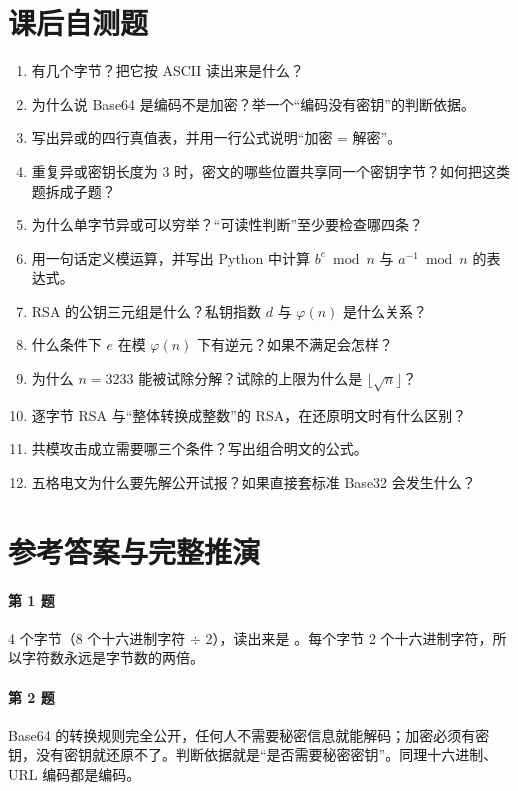 \documentclass[UTF8,12pt,oneside]{ctexbook}
\begin{document}
\section{课后自测题}
\begin{enumerate}
\item {} 有几个字节？把它按 ASCII 读出来是什么？
\item 为什么说 Base64 是编码不是加密？举一个“编码没有密钥”的判断依据。
\item 写出异或的四行真值表，并用一行公式说明“加密 = 解密”。
\item 重复异或密钥长度为 3 时，密文的哪些位置共享同一个密钥字节？如何把这类题拆成子题？
\item 为什么单字节异或可以穷举？“可读性判断”至少要检查哪四条？
\item 用一句话定义模运算，并写出 Python 中计算 $b^{e} \bmod n$ 与 $a^{-1} \bmod n$ 的表达式。
\item RSA 的公钥三元组是什么？私钥指数 $d$ 与 $\varphi(n)$ 是什么关系？
\item 什么条件下 $e$ 在模 $\varphi(n)$ 下有逆元？如果不满足会怎样？
\item 为什么 $n = 3233$ 能被试除分解？试除的上限为什么是 $\lfloor\sqrt{n}\rfloor$？
\item 逐字节 RSA 与“整体转换成整数”的 RSA，在还原明文时有什么区别？
\item 共模攻击成立需要哪三个条件？写出组合明文的公式。
\item 五格电文为什么要先解公开试报？如果直接套标准 Base32 会发生什么？
\end{enumerate}

\section{参考答案与完整推演}

\paragraph{第 1 题}4 个字节（8 个十六进制字符 $\div$ 2），读出来是 。每个字节 2 个十六进制字符，所以字符数永远是字节数的两倍。

\paragraph{第 2 题}Base64 的转换规则完全公开，任何人不需要秘密信息就能解码；加密必须有密钥，没有密钥就还原不了。判断依据就是“是否需要秘密密钥”。同理十六进制、URL 编码都是编码。
\end{document}
